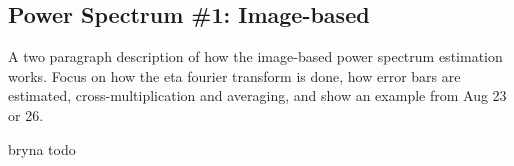 \subsection{Power Spectrum \#1: Image-based}
A two paragraph description of how the image-based power spectrum estimation works. Focus on how the eta fourier transform is done, how error bars are estimated, cross-multiplication and averaging, and show an example from Aug 23 or 26.

bryna todo